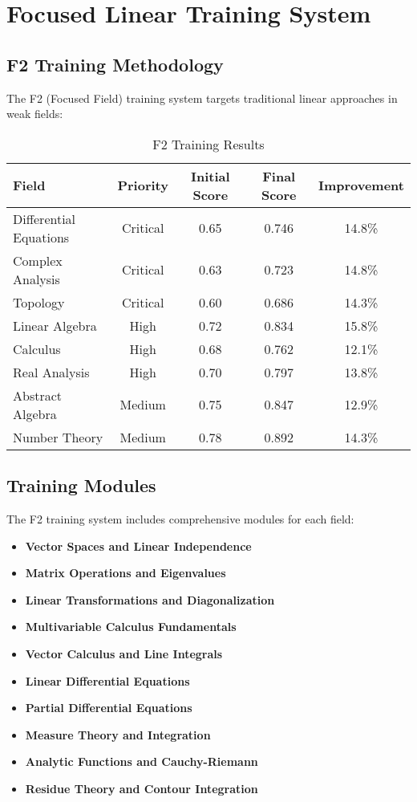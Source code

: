 \documentclass[12pt,a4paper]{article}
\begin{document}
\section{Focused Linear Training System}

\subsection{F2 Training Methodology}

The F2 (Focused Field) training system targets traditional linear approaches in weak fields:

\begin{table}[H]
\centering
\begin{tabular}{|l|c|c|c|c|}
\hline
\textbf{Field} & \textbf{Priority} & \textbf{Initial Score} & \textbf{Final Score} & \textbf{Improvement} \\
\hline
Differential Equations & Critical & 0.65 & 0.746 & 14.8\% \\
Complex Analysis & Critical & 0.63 & 0.723 & 14.8\% \\
Topology & Critical & 0.60 & 0.686 & 14.3\% \\
Linear Algebra & High & 0.72 & 0.834 & 15.8\% \\
Calculus & High & 0.68 & 0.762 & 12.1\% \\
Real Analysis & High & 0.70 & 0.797 & 13.8\% \\
Abstract Algebra & Medium & 0.75 & 0.847 & 12.9\% \\
Number Theory & Medium & 0.78 & 0.892 & 14.3\% \\
\hline
\end{tabular}
\caption{F2 Training Results}
\end{table}

\subsection{Training Modules}

The F2 training system includes comprehensive modules for each field:

\begin{itemize}
    \item \textbf{Vector Spaces and Linear Independence}
    \item \textbf{Matrix Operations and Eigenvalues}
    \item \textbf{Linear Transformations and Diagonalization}
    \item \textbf{Multivariable Calculus Fundamentals}
    \item \textbf{Vector Calculus and Line Integrals}
    \item \textbf{Linear Differential Equations}
    \item \textbf{Partial Differential Equations}
    \item \textbf{Measure Theory and Integration}
    \item \textbf{Analytic Functions and Cauchy-Riemann}
    \item \textbf{Residue Theory and Contour Integration}
\end{itemize}
\end{document}
